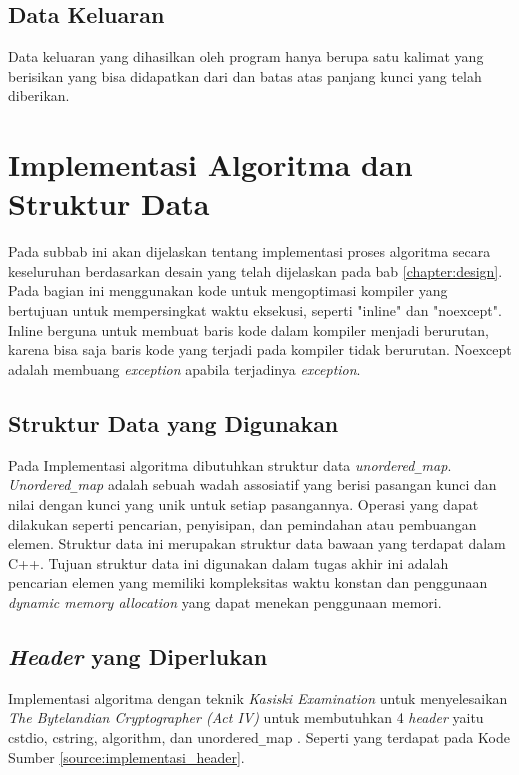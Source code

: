 \subsection{Data Keluaran}
Data keluaran yang dihasilkan oleh program hanya berupa satu kalimat yang berisikan \plaintext yang bisa didapatkan dari \ciphertext dan batas atas panjang kunci yang telah diberikan.

\section{Implementasi Algoritma dan Struktur Data}
Pada subbab ini akan dijelaskan tentang implementasi proses
algoritma secara keseluruhan berdasarkan desain yang telah dijelaskan pada bab \ref{chapter:design}. Pada bagian ini menggunakan kode untuk mengoptimasi kompiler yang bertujuan untuk mempersingkat waktu eksekusi, seperti "inline" dan "noexcept". Inline berguna untuk membuat baris kode dalam kompiler menjadi berurutan, karena bisa saja baris kode yang terjadi pada kompiler tidak berurutan. Noexcept adalah membuang  \textit{exception} apabila terjadinya \textit{exception}.

\subsection{Struktur Data yang Digunakan}
Pada Implementasi algoritma dibutuhkan struktur data \textit{unordered}\verb|_|\textit{map}. \textit{Unordered}\verb|_|\textit{map} adalah sebuah wadah assosiatif yang berisi pasangan kunci dan nilai dengan kunci yang unik untuk setiap pasangannya. Operasi yang dapat dilakukan seperti pencarian, penyisipan, dan pemindahan atau pembuangan elemen. Struktur data ini merupakan struktur data bawaan yang terdapat dalam C++. Tujuan struktur data ini digunakan dalam tugas akhir ini adalah pencarian elemen yang memiliki kompleksitas waktu konstan dan penggunaan \textit{dynamic memory allocation} yang dapat menekan penggunaan memori. 

\subsection{\textit{Header} yang Diperlukan}
Implementasi algoritma dengan teknik \textit{Kasiski Examination} untuk menyelesaikan \textit{The Bytelandian Cryptographer (Act IV)} untuk membutuhkan 4 \textit{header} yaitu {\selectfont cstdio, cstring, algorithm,} dan {\selectfont unordered\verb|_|map} . Seperti yang terdapat pada Kode Sumber \ref{source:implementasi_header}.

